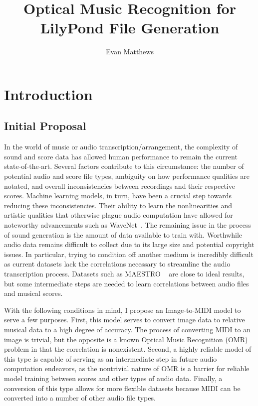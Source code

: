 \documentclass[nonacm, sigconf]{acmart}
\begin{document}
\title[omr-lilypond-midi]{Optical Music Recognition for LilyPond File Generation}
\author{Evan Matthews}

\maketitle

\section{Introduction}
\subsection{Initial Proposal}

In the world of music or audio transcription/arrangement, the complexity of sound and score data has allowed human performance to remain the current state-of-the-art. 
Several factors contribute to this circumstance: the number of potential audio and score file types, ambiguity on how performance qualities are notated, and overall inconsistencies between recordings and their respective scores. 
Machine learning models, in turn, have been a crucial step towards reducing these inconsistencies. 
Their ability to learn the nonlinearities and artistic qualities that otherwise plague audio computation have allowed for noteworthy advancements such as WaveNet~\cite{oord2016wavenet}. 
The remaining issue in the process of sound generation is the amount of data available to train with. 
Worthwhile audio data remains difficult to collect due to its large size and potential copyright issues. 
In particular, trying to condition off another medium is incredibly difficult as current datasets lack the correlations necessary to streamline the audio transcription process. 
Datasets such as MAESTRO ~\cite{hawthorne2018enabling} are close to ideal results, but some intermediate steps are needed to learn correlations between audio files and musical scores.

With the following conditions in mind, I propose an Image-to-MIDI model to serve a few purposes. First, this model serves to convert image data to relative musical data to a high degree of accuracy. The process of converting MIDI to an image is trivial, but the opposite is a known Optical Music Recognition (OMR) problem in that the correlation is nonexistent. 
Second, a highly reliable model of this type is capable of serving as an intermediate step in future audio computation endeavors, as the nontrivial nature of OMR is a barrier for reliable model training between scores and other types of audio data. 
Finally, a conversion of this type allows for more flexible datasets because MIDI can be converted into a number of other audio file types.
\end{document}
